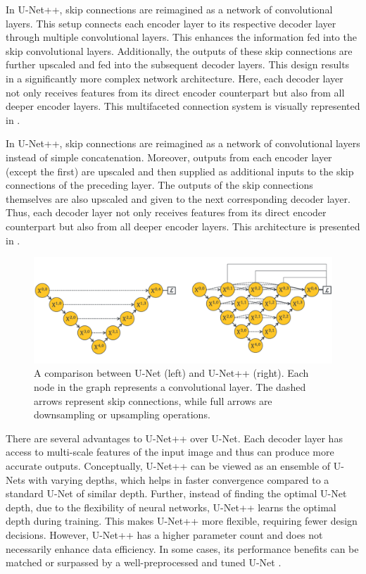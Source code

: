 In U-Net++, skip connections are reimagined as a network of convolutional layers. This setup connects each encoder layer to its respective decoder layer through multiple convolutional layers.  This enhances the information fed into the skip convolutional layers. Additionally, the outputs of these skip connections are further upscaled and fed into the subsequent decoder layers. This design results in a significantly more complex network architecture. Here, each decoder layer not only receives features from its direct encoder counterpart but also from all deeper encoder layers. This multifaceted connection system is visually represented in .

 
 In U-Net++, skip connections are reimagined as a network of convolutional layers instead of simple concatenation. Moreover, outputs from each encoder layer (except the first) are upscaled and then supplied as additional inputs to the skip connections of the preceding layer. The outputs of the skip connections themselves are also upscaled and given to the next corresponding decoder layer. Thus, each decoder layer not only receives features from its direct encoder counterpart but also from all deeper encoder layers. This architecture is presented in .
 
 \begin{figure}[h!]
 \centering
 \includegraphics[width=\linewidth]{images/unetpp-arch}
 \caption{A comparison between U-Net (left) and U-Net++ (right). Each node in the graph represents a convolutional layer. The dashed arrows represent skip connections, while full arrows are downsampling or upsampling operations. \cite{zhou2019unetplusplus}}
 \label{fig:unetpp-arch}
 \end{figure}
  
There are several advantages to U-Net++ over U-Net. Each decoder layer has access to multi-scale features of the input image and thus can produce more accurate outputs. Conceptually, U-Net++ can be viewed as an ensemble of U-Nets with varying depths, which helps in faster convergence compared to a standard U-Net of similar depth. Further, instead of finding the optimal U-Net depth, due to the flexibility of neural networks, U-Net++ learns the optimal depth during training. This makes U-Net++ more flexible, requiring fewer design decisions. However, U-Net++ has a higher parameter count and does not necessarily enhance data efficiency. In some cases, its performance benefits can be matched or surpassed by a well-preprocessed and tuned U-Net \cite{isenseeNnUNetSelfconfiguringMethod2021}.


